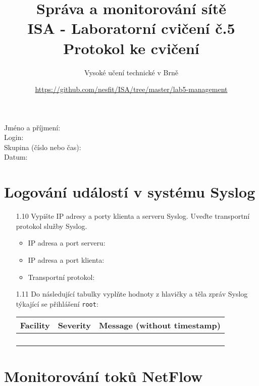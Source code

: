 \documentclass[a4paper,11pt]{article}
\title{Správa a monitorování sítě\\
{\bf\large ISA - Laboratorní cvičení č.5}\\
{\bf\large Protokol ke cvičení}}
\author{Vysoké učení technické v Brně}
\date{\url{https://github.com/nesfit/ISA/tree/master/lab5-management}}
\begin{document}
 

{\let\newpage\relax\maketitle}

Jméno a příjmení:\\
Login:\\
Skupina (číslo nebo čas):\\
Datum:\\

\section{Logování událostí v systému Syslog}

\begin{itemize}
    \item [1.10] Vypište IP adresy a porty klienta a serveru Syslog. Uveďte transportní protokol služby Syslog.
    \begin{itemize}
        \item IP adresa a port serveru:
        \item IP adresa a port klienta:
        \item Transportní protokol: 
    \end{itemize}
  \item [1.11]  Do následující tabulky vyplňte hodnoty z hlavičky a těla zpráv Syslog týkající se přihlášení {\tt root}:
    
    \begin{tabular}{|p{3cm}|p{3cm}|p{92mm}|}
      \hline
      \bf Facility & \bf Severity & \bf Message (without timestamp)\\
      \hline
      &&\\
      &&\\
      \hline
      && \\
      && \\
      \hline
    \end{tabular}
\end{itemize}

\section{Monitorování toků NetFlow}
\end{document}
